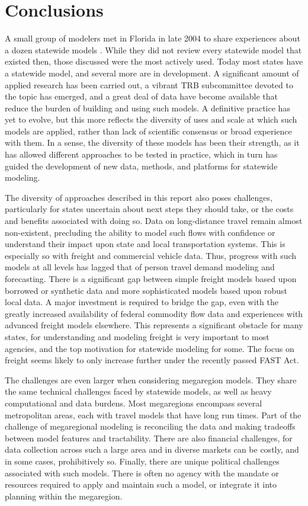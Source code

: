 \chapter{Conclusions}\label{sec:conclusions}

A small group of modelers met in Florida in late 2004 to share experiences about a dozen statewide models \citep{giaimo05}. While they did not review every statewide model that existed then, those discussed were the most actively used. Today most states have a statewide model, and several more are in development. A significant amount of applied research has been carried out, a vibrant TRB subcommittee devoted to the topic has emerged, and a great deal of data have become available that reduce the burden of building and using such models. A definitive practice has yet to evolve, but this more reflects the diversity of uses and scale at which such models are applied, rather than lack of scientific consensus or broad experience with them. In a sense, the diversity of these models has been their strength, as it has allowed different approaches to be tested in practice, which in turn has guided the development of new data, methods, and platforms for statewide modeling.

The diversity of approaches described in this report also poses challenges, particularly for states uncertain about next steps they should take, or the costs and benefits associated with doing so. Data on long-distance travel remain almost non-existent, precluding the ability to model such flows with confidence or understand their impact upon state and local transportation systems. This is especially so with freight and commercial vehicle data. Thus, progress with such models at all levels has lagged that of person travel demand modeling and forecasting. There is a significant gap between simple freight models based upon borrowed or synthetic data and more sophisticated models based upon robust local data. A major investment is required to bridge the gap, even with the greatly increased availability of federal commodity flow data and experiences with advanced freight models elsewhere. This represents a significant obstacle for many states, for understanding and modeling freight is very important to most agencies, and the top motivation for statewide modeling for some. The focus on freight seems likely to only increase further under the recently passed FAST Act.

The challenges are even larger when considering megaregion models. They share the same technical challenges faced by statewide models, as well as heavy computational and data burdens. Most megaregions encompass several metropolitan areas, each with travel models that have long run times. Part of the challenge of megaregional modeling is reconciling the data and making tradeoffs between model features and tractability. There are also financial challenges, for data collection across such a large area and in diverse markets can be costly, and in some cases, prohibitively so. Finally, there are unique political challenges associated with such models. There is often no agency with the mandate or resources required to apply and maintain such a model, or integrate it into planning within the megaregion.


